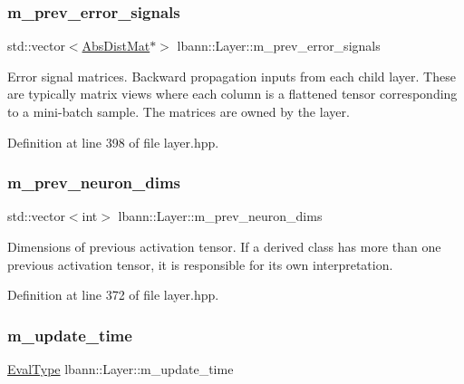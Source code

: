 \subsubsection{\texorpdfstring{m\+\_\+prev\+\_\+error\+\_\+signals}{m\_prev\_error\_signals}}
{\footnotesize\ttfamily std\+::vector$<$\hyperlink{base_8hpp_a9a697a504ae84010e7439ffec862b470}{Abs\+Dist\+Mat}$\ast$$>$ lbann\+::\+Layer\+::m\+\_\+prev\+\_\+error\+\_\+signals\hspace{0.3cm}{\ttfamily [protected]}}

Error signal matrices. Backward propagation inputs from each child layer. These are typically matrix views where each column is a flattened tensor corresponding to a mini-\/batch sample. The matrices are owned by the layer. 

Definition at line 398 of file layer.\+hpp.

\mbox{\label{classlbann_1_1Layer_ae204d1a2a79606eaa117273857ff62a3}} 
\subsubsection{\texorpdfstring{m\+\_\+prev\+\_\+neuron\+\_\+dims}{m\_prev\_neuron\_dims}}
{\footnotesize\ttfamily std\+::vector$<$int$>$ lbann\+::\+Layer\+::m\+\_\+prev\+\_\+neuron\+\_\+dims\hspace{0.3cm}{\ttfamily [protected]}}

Dimensions of previous activation tensor. If a derived class has more than one previous activation tensor, it is responsible for its own interpretation. 

Definition at line 372 of file layer.\+hpp.

\mbox{\label{classlbann_1_1Layer_ab7d84533662b02d01ba6685ad6f20935}} 
\subsubsection{\texorpdfstring{m\+\_\+update\+\_\+time}{m\_update\_time}}
{\footnotesize\ttfamily \hyperlink{base_8hpp_a3266f5ac18504bbadea983c109566867}{Eval\+Type} lbann\+::\+Layer\+::m\+\_\+update\+\_\+time\hspace{0.3cm}{\ttfamily [protected]}}

